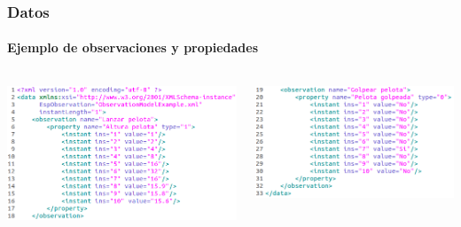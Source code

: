 \begin{frame}
	\frametitle{Datos}
	\framesubtitle{Ejemplo de observaciones y propiedades}
	
	\begin{columns}[T] %
		\begin{column}[T]{5cm} %
			\begin{center}
				\includegraphics[width=1.1\linewidth]{./Figures/Datos1.png}
			\end{center}

		\end{column}
		\begin{column}[T]{5cm} %
			\begin{center}
				\includegraphics[width=1.1\linewidth]{./Figures/Datos2.png}
			\end{center}
		\end{column}
	\end{columns}
\end{frame}

